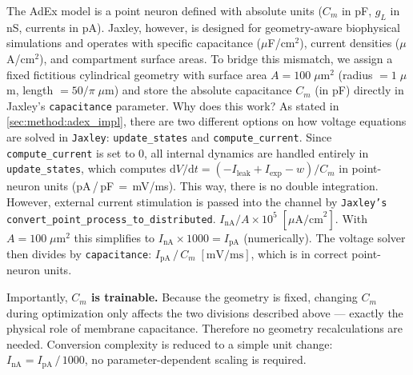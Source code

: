 The \gls{AdEx} model is a point neuron defined with absolute units ($C_m$ in pF, $g_L$ in nS, currents in pA).
Jaxley, however, is designed for geometry-aware biophysical simulations and operates with specific capacitance ($\mu$F/cm$^2$), current densities ($\mu$A/cm$^2$), and compartment surface areas.
To bridge this mismatch, we assign a fixed fictitious cylindrical geometry with surface area
$A = 100\;\mu\text{m}^2$ (radius $= 1\;\mu$m, length $= 50/\pi\;\mu$m) and store the absolute capacitance $C_m$ (in pF) directly in Jaxley's \texttt{capacitance} parameter.
Why does this work?
As stated in \cref{sec:method:adex_impl}, there are two different options on how voltage equations are solved in \texttt{Jaxley}: \texttt{update\_states} and \texttt{compute\_current}.
Since \texttt{compute\_current} is set to 0, all internal dynamics are handled entirely in \texttt{update\_states}, which computes
$\mathrm{d}V/\mathrm{d}t = (-I_\text{leak} + I_\text{exp} - w) / C_m$
in point-neuron units (pA\,/\,pF\,$=$\,mV/ms).
This way, there is no double integration.
However, external current stimulation is passed into the channel by \texttt{Jaxley's} \texttt{convert\-\_point\-\_process\-\_to\-\_distributed}.
$I_\text{nA} / A \times 10^5\;[\mu\text{A/cm}^2]$.
With $A = 100\;\mu\text{m}^2$ this simplifies to $I_\text{nA} \times 1000 = I_\text{pA}$ (numerically).
The voltage solver then divides by \texttt{capacitance}: $I_\text{pA}\,/\,C_m\;[\text{mV/ms}]$, which is in correct point-neuron units.

Importantly, \textbf{$C_m$ is trainable.}
Because the geometry is fixed, changing $C_m$ during optimization only affects the two divisions described above --- exactly the physical role of membrane capacitance.
Therefore no geometry recalculations are needed.
Conversion complexity is reduced to a simple unit change: $I_\text{nA} = I_\text{pA}\,/\,1000$, no parameter-dependent scaling is required.

